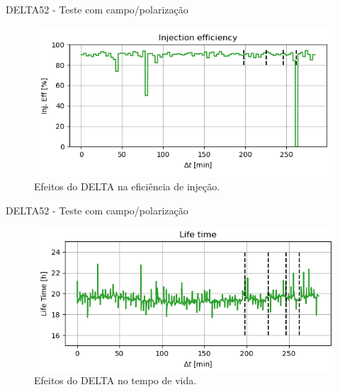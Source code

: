 \documentclass{beamer}					  %
\begin{document}
\begin{frame}{DELTA52 - Teste com campo/polarização}
            \begin{figure}[H]
    		\centering
            \includegraphics[width=1\textwidth]{2023-11-17/figures/inj_eff.png}
            \caption{Efeitos do DELTA na eficiência de injeção.}
            \label{fig:inj_eff}
    \end{figure}
\end{frame}

\begin{frame}{DELTA52 - Teste com campo/polarização}
            \begin{figure}[H]
    		\centering
            \includegraphics[width=1\textwidth]{2023-11-17/figures/lifetime.png}
            \caption{Efeitos do DELTA no tempo de vida.}
            \label{fig:lifetime}
    \end{figure}
\end{frame}
\end{document}
